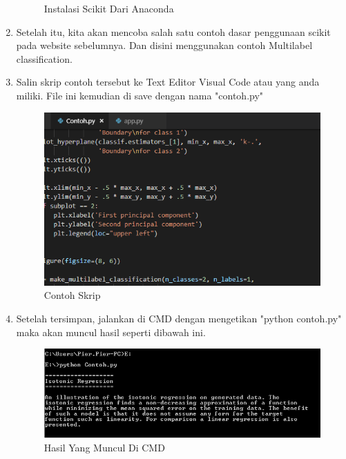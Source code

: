 \begin{enumerate}
\begin{figure}[!htbp]
\begin{center}
   	 \caption{Instalasi Scikit Dari Anaconda}	
	\end{center}
\end{figure}
\item 
Setelah itu, kita akan mencoba salah satu contoh dasar penggunaan scikit pada website sebelumnya. Dan disini menggunakan contoh Multilabel classification.
\item 
Salin skrip contoh tersebut ke Text Editor Visual Code atau yang anda miliki. File ini kemudian di save dengan nama "contoh.py"
\begin{figure}
	\begin{center}
   	 \includegraphics[scale=1]{figures/contoh.png}
   	 \caption{Contoh Skrip}	
	\end{center}
\end{figure}
\item 
Setelah tersimpan, jalankan di CMD dengan mengetikan "python contoh.py" maka akan muncul hasil seperti dibawah ini.
\begin{figure}
	\begin{center}
   	 \includegraphics[scale=1]{figures/hasil1.png}
   	 \caption{Hasil Yang Muncul Di CMD}	
	\end{center}
\end{figure}
\begin{figure}
	\begin{center}

\end{center}
\end{figure}
\end{enumerate}
